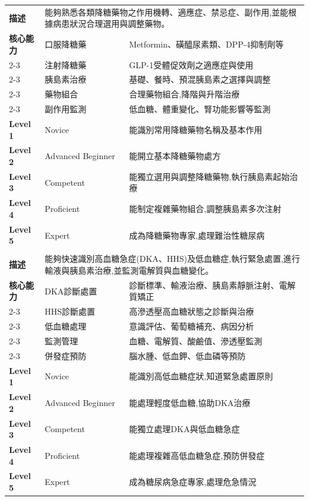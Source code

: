 \documentclass[12pt,a4paper]{article}
\begin{document}
\begin{longtable}{|p{1.2cm}|p{3.8cm}|p{8.5cm}|}
\rowcolor{endo_blue!10}
\multicolumn{3}{|c|}{\textbf{EPA 2: 糖尿病相關用藥認識與使用}} \\
\hline
\textbf{描述} & \multicolumn{2}{|p{12.5cm}|}{能夠熟悉各類降糖藥物之作用機轉、適應症、禁忌症、副作用,並能根據病患狀況合理選用與調整藥物。} \\
\hline
\textbf{核心能力} & 口服降糖藥 & Metformin、磺醯尿素類、DPP-4抑制劑等 \\
\cline{2-3}
& 注射降糖藥 & GLP-1受體促效劑之適應症與使用 \\
\cline{2-3}
& 胰島素治療 & 基礎、餐時、預混胰島素之選擇與調整 \\
\cline{2-3}
& 藥物組合 & 合理藥物組合,降階與升階治療 \\
\cline{2-3}
& 副作用監測 & 低血糖、體重變化、腎功能影響等監測 \\
\hline
\textbf{Level 1} & Novice & 能識別常用降糖藥物名稱及基本作用 \\
\hline
\textbf{Level 2} & Advanced Beginner & 能開立基本降糖藥物處方 \\
\hline
\textbf{Level 3} & Competent & 能獨立選用與調整降糖藥物,執行胰島素起始治療 \\
\hline
\textbf{Level 4} & Proficient & 能制定複雜藥物組合,調整胰島素多次注射 \\
\hline
\textbf{Level 5} & Expert & 成為降糖藥物專家,處理難治性糖尿病 \\
\hline

\rowcolor{endo_blue!10}
\multicolumn{3}{|c|}{\textbf{EPA 3: 高血糖與低血糖急症處理}} \\
\hline
\textbf{描述} & \multicolumn{2}{|p{12.5cm}|}{能夠快速識別高血糖急症(DKA、HHS)及低血糖症,執行緊急處置,進行輸液與胰島素治療,並監測電解質與血糖變化。} \\
\hline
\textbf{核心能力} & DKA診斷處置 & 診斷標準、輸液治療、胰島素靜脈注射、電解質矯正 \\
\cline{2-3}
& HHS診斷處置 & 高滲透壓高血糖狀態之診斷與治療 \\
\cline{2-3}
& 低血糖處理 & 意識評估、葡萄糖補充、病因分析 \\
\cline{2-3}
& 監測管理 & 血糖、電解質、酸鹼值、滲透壓監測 \\
\cline{2-3}
& 併發症預防 & 腦水腫、低血鉀、低血磷等預防 \\
\hline
\textbf{Level 1} & Novice & 能識別高低血糖症狀,知道緊急處置原則 \\
\hline
\textbf{Level 2} & Advanced Beginner & 能處理輕度低血糖,協助DKA治療 \\
\hline
\textbf{Level 3} & Competent & 能獨立處理DKA與低血糖急症 \\
\hline
\textbf{Level 4} & Proficient & 能處理複雜高低血糖急症,預防併發症 \\
\hline
\textbf{Level 5} & Expert & 成為糖尿病急症專家,處理危急情況 \\
\hline


\end{longtable}
\end{document}
